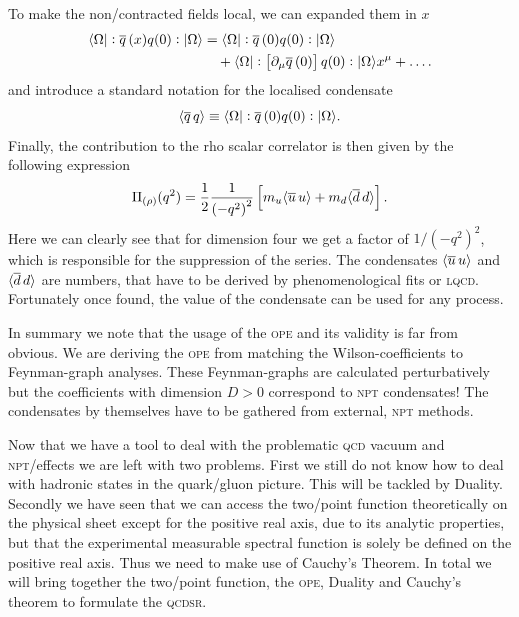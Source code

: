 \documentclass[../../index.tex]{subfiles}
\begin{document}
To make the non\-/contracted fields local, we can expanded them in $x$
\begin{equation}
  \begin{split}
    \langle \Omega \vert: \overline{q}\,(x) q(0):\vert \Omega \rangle &= \langle\Omega\vert: \overline{q}\,(0) q(0): \vert\Omega\rangle\\
    &\quad+ \langle\Omega\vert:\left[ \partial_\mu \overline{q}\,(0) \right]
    q(0):\vert\Omega\rangle x^\mu + \dots.
  \end{split}
\end{equation}
and introduce a standard notation for the localised condensate
\begin{equation}
  \langle \overline{q}\,q \rangle \equiv \langle\Omega\vert: \overline{q}\,(0) q(0):\vert\Omega\rangle.
\end{equation}
Finally, the contribution to the rho scalar correlator is then given by the
following expression
\begin{equation}
  \Pi_{(\rho)}(q^2) = \frac{1}{2} \frac{1}{\left(-q^2\right)^2} \left[ m_u\langle \overline{u}\, u \rangle + m_d \langle \overline{d}\, d \rangle\right].
\end{equation}
Here we can clearly see that for dimension four we get a factor of
\(1/(-q^2)^2\), which is responsible for the suppression of the series. The
condensates \(\langle\overline{u}\,u\rangle\) and \(\langle\overline{d}\,d\rangle\) are
numbers, that have to be derived by phenomenological fits or \textsc{lqcd}.
Fortunately once found, the value of the condensate can be used for any process.

In summary we note that the usage of the \textsc{ope} and its validity is far
from obvious. We are deriving the \textsc{ope} from matching the
Wilson-coefficients to Feynman-graph analyses. These Feynman-graphs are
calculated perturbatively but the coefficients with dimension $D>0$ correspond
to \textsc{npt} condensates! The condensates by themselves have to be gathered
from external, \textsc{npt} methods.

Now that we have a tool to deal with the problematic \textsc{qcd} vacuum and
\textsc{npt}\-/effects we are left with two problems. First we still do not know
how to deal with hadronic states in the quark\-/gluon picture. This will be
tackled by Duality. Secondly we have seen that we can access the two\-/point
function theoretically on the physical sheet except for the positive real axis, due to its
analytic properties, but that the experimental measurable spectral function is
solely be defined on the positive real axis. Thus we need to make use of
Cauchy's Theorem. In total we will bring together the two\-/point function, the
\textsc{ope}, Duality and Cauchy's theorem to formulate the \textsc{qcdsr}.
\end{document}
